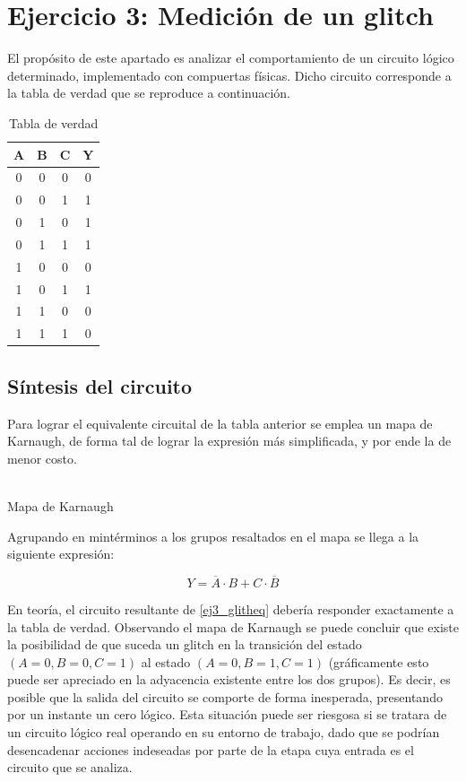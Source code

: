 \section{Ejercicio 3: Medici\'on de un glitch}

El prop\'osito de este apartado es analizar el comportamiento de un circuito l\'ogico determinado, implementado con compuertas f\'isicas. Dicho circuito corresponde a la tabla de verdad que se reproduce a continuaci\'on.

\begin{table}[H]
\centering
\label{tab:ej3_tabla_verdad}
\begin{tabular}{ccc|c}
A & B & C & Y \\ \hline
0 & 0 & 0 & 0 \\
0 & 0 & 1 & 1 \\
0 & 1 & 0 & 1 \\
0 & 1 & 1 & 1 \\
1 & 0 & 0 & 0 \\
1 & 0 & 1 & 1 \\
1 & 1 & 0 & 0 \\
1 & 1 & 1 & 0
\end{tabular}
\caption{Tabla de verdad}
\end{table}

\subsection{S\'intesis del circuito}
Para lograr el equivalente circuital de la tabla anterior se emplea un mapa de Karnaugh, de forma tal de lograr la expresi\'on m\'as simplificada, y por ende la de menor costo.

\begin{center}
    \begin{Karnaughvuit}
        \label{Karnaugh_glitch}
	\end{Karnaughvuit}\\
Mapa de Karnaugh
\end{center}


Agrupando en mint\'erminos a los grupos resaltados en el mapa se llega a la siguiente expresi\'on:

\begin{equation}
\label{ej3_glitheq}
 Y = \overline{A}\cdot B + C \cdot \overline{B}
\end{equation}

En teor\'ia, el circuito resultante de \ref{ej3_glitheq} deber\'ia responder exactamente a la tabla de verdad. Observando el mapa de Karnaugh se puede concluir que existe la posibilidad de que suceda un glitch en la transici\'on del estado $(A = 0, B = 0, C = 1)$ al estado $(A = 0, B = 1, C = 1)$ (gr\'aficamente esto puede ser apreciado en la adyacencia existente entre los dos grupos). Es decir, es posible que la salida del circuito se comporte de forma inesperada, presentando por un instante un cero l\'ogico. Esta situaci\'on puede ser riesgosa si se tratara de un circuito l\'ogico real operando en su entorno de trabajo, dado que se podr\'ian desencadenar acciones indeseadas por parte de la etapa cuya entrada es el circuito que se analiza.

